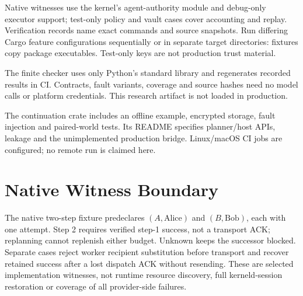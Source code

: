 \documentclass[letterpaper,twocolumn,10pt]{article}
\begin{document}
Native witnesses use the kernel's agent-authority module and debug-only
executor support; test-only policy and vault cases cover accounting and replay.
Verification records name exact commands and source snapshots. Run differing
Cargo feature configurations sequentially or in separate target directories:
fixtures copy package executables. Test-only keys are not production trust
material.

The finite checker uses only Python's standard library and regenerates recorded
results in CI. Contracts, fault variants, coverage and source hashes need no
model calls or platform credentials. This research artifact is not loaded in
production.

The continuation crate includes an offline example, encrypted storage, fault
injection and paired-world tests. Its README specifies planner/host APIs,
leakage and the unimplemented production bridge. Linux/macOS CI jobs are
configured; no remote run is claimed here.

\section{Native Witness Boundary}

The native two-step fixture predeclares $(A,\mathrm{Alice})$ and
$(B,\mathrm{Bob})$, each with one attempt. Step 2 requires verified step-1
success, not a transport ACK; replanning cannot replenish either budget.
Unknown keeps the successor blocked. Separate cases reject worker recipient
substitution before transport and recover retained success after a lost dispatch
ACK without resending. These are selected implementation witnesses, not runtime
resource discovery, full kerneld-session restoration or coverage of all
provider-side failures.
\end{document}
